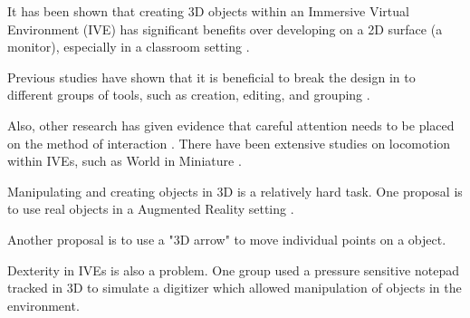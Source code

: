 It has been shown that creating 3D objects within an Immersive Virtual
Environment (IVE) has significant benefits over developing on a 2D surface (a
monitor)\cite{Kaufmann:Usability}, especially in a classroom setting
\cite{Kaufmann:LearningGeometry}.

Previous studies have shown that it is beneficial to break the design in to
different groups of tools, such as creation, editing, and grouping
\cite{Butterworth:1992:3DM}.

Also, other research has given evidence that careful attention needs to be
placed on the method of interaction \cite{Bowman98interactiontechniques}.
There have been extensive studies on locomotion within IVEs, such as World in
Miniature \cite{Pausch:WorldInMiniature}.

Manipulating and creating objects in 3D is a relatively hard task.  One
proposal is to use real objects in a Augmented Reality setting
\cite{Jota:2011:CVM:1979742.1979915}.

Another proposal is to use a "3D arrow" to move individual points on a object\cite{5759472}.

Dexterity in IVEs is also a problem.  One group used a pressure sensitive 
notepad tracked in 3D to simulate a digitizer which allowed manipulation of
objects in the environment\cite{658467}.
